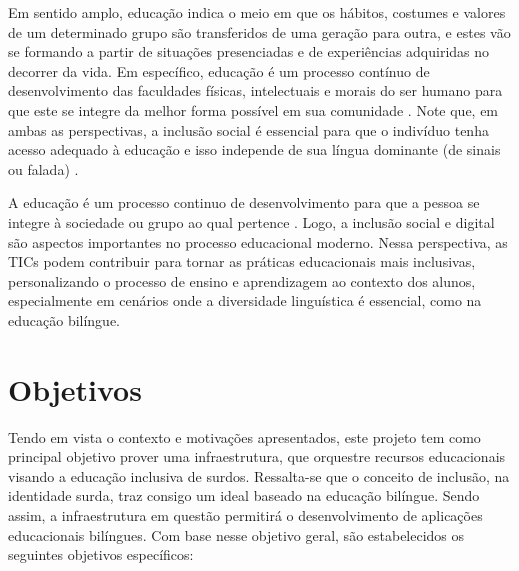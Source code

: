 Em sentido amplo, educação indica o meio em que os hábitos, costumes e valores de um determinado grupo são transferidos de uma geração para outra, e estes vão se formando a partir de situações presenciadas e de experiências adquiridas no decorrer da vida. Em específico, educação é um processo contínuo de desenvolvimento das faculdades físicas, intelectuais e morais do ser humano para que este se integre da melhor forma possível em sua comunidade \cite{Cilli2017,Quadros2019}. Note que, em ambas as perspectivas, a inclusão social é essencial para que o indivíduo tenha acesso adequado à educação e isso independe de sua língua dominante (de sinais ou falada) \cite{Quadros2019}. 

A educação é um processo continuo de desenvolvimento para que a pessoa se integre à sociedade ou grupo ao qual pertence \cite{Cilli2017,Quadros2019}. Logo, a inclusão social e digital são aspectos importantes no processo educacional moderno. Nessa perspectiva, as TICs podem contribuir para tornar as práticas educacionais mais inclusivas, personalizando o processo de ensino e aprendizagem ao contexto dos alunos, especialmente em cenários onde a diversidade linguística é essencial, como na educação bilíngue.

\section{Objetivos}

Tendo em vista o contexto e motivações apresentados, este projeto tem como principal objetivo prover uma infraestrutura, que orquestre recursos educacionais visando a educação inclusiva de surdos. Ressalta-se que o conceito de inclusão, na identidade surda, traz consigo um ideal baseado na educação bilíngue. Sendo assim, a infraestrutura em questão permitirá o desenvolvimento de aplicações educacionais bilíngues. %
Com base nesse objetivo geral, são estabelecidos os seguintes objetivos específicos:

